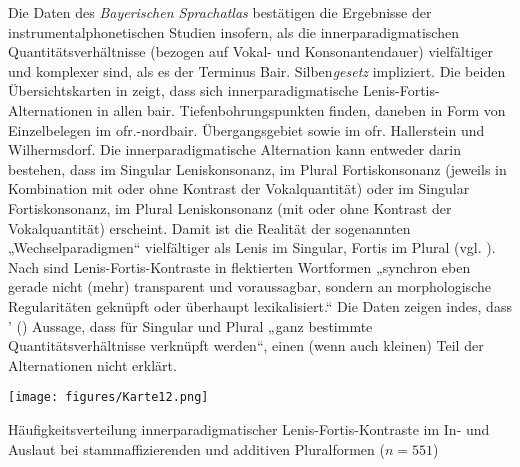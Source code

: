 Die Daten des \textit{Bayerischen Sprachatlas} bestätigen die Ergebnisse der instrumentalphonetischen Studien insofern, als die innerparadigmatischen Quantitätsverhältnisse (bezogen auf Vokal- und Konsonantendauer) vielfältiger und komplexer sind, als es der Terminus Bair. Silben\textit{gesetz} impliziert. Die beiden Übersichtskarten in  zeigt, dass sich innerparadigmatische Lenis-Fortis-Al\-ter\-na\-tio\-nen in allen bair. Tiefenbohrungspunkten finden, daneben in Form von Einzelbelegen im ofr.-nordbair. Übergangsgebiet sowie im ofr. Hallerstein und Wilhermsdorf. Die innerparadigmatische Alternation kann entweder darin bestehen, dass im Singular Leniskonsonanz, im Plural Fortiskonsonanz (jeweils in Kombination mit oder ohne Kontrast der Vokalquantität) oder im Singular Fortiskonsonanz, im Plural Leniskonsonanz (mit oder ohne Kontrast der Vokalquantität) erscheint. Damit ist die Realität der sogenannten „Wechselparadigmen“ \citep[37]{Hinderling1980} vielfältiger als Lenis im Singular, Fortis im Plural (vgl. \citealt[123]{Rowley1997}). Nach \citet[179]{Scheutz1985} sind Lenis-Fortis-Kontraste in flektierten Wortformen „synchron eben gerade nicht (mehr) transparent und voraussagbar, sondern an morphologische Regularitäten geknüpft oder überhaupt lexikalisiert.“ Die Daten zeigen indes, dass \citeauthor{Scheutz1984}' (\citeyear[17]{Scheutz1984}) Aussage, dass für Singular und Plural „ganz bestimmte Quantitätsverhältnisse verknüpft werden“, einen (wenn auch kleinen) Teil der Alternationen nicht erklärt.

\vfill
\begin{map}[H]
\texttt{[image: figures/Karte12.png]}
\caption{Häufigkeitsverteilung innerparadigmatischer Lenis-Fortis-Kontraste im In- und Auslaut bei stammaffizierenden und additiven Pluralformen ($n=551$)}
\label{map:12}
\end{map}
\vfill\pagebreak

